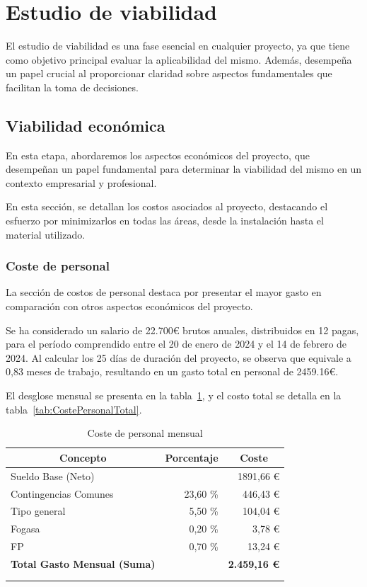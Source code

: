 \section{Estudio de viabilidad}
El estudio de viabilidad es una fase esencial en cualquier proyecto, ya que tiene como objetivo principal evaluar la aplicabilidad del mismo. Además, desempeña un papel crucial al proporcionar claridad sobre aspectos fundamentales que facilitan la toma de decisiones.

\subsection{Viabilidad económica}
En esta etapa, abordaremos los aspectos económicos del proyecto, que desempeñan un papel fundamental para determinar la viabilidad del mismo en un contexto empresarial y profesional.

En esta sección, se detallan los costos asociados al proyecto, destacando el esfuerzo por minimizarlos en todas las áreas, desde la instalación hasta el material utilizado.

\subsubsection{Coste de personal}
La sección de costos de personal destaca por presentar el mayor gasto en comparación con otros aspectos económicos del proyecto.

Se ha considerado un salario de 22.700€ brutos anuales, distribuidos en 12 pagas, para el período comprendido entre el 20 de enero de 2024 y el 14 de febrero de 2024. Al calcular los 25 días de duración del proyecto, se observa que equivale a 0,83 meses de trabajo, resultando en un gasto total en personal de 2459.16€.

El desglose mensual se presenta en la tabla~\ref{tab:CostePersonal}, y el costo total se detalla en la tabla~\ref{tab:CostePersonalTotal}.

\begin{longtable}[c]{@{}lrr@{}}
\toprule
\multicolumn{1}{c}{\textbf{Concepto}} & \multicolumn{1}{c}{\textbf{Porcentaje}} & \multicolumn{1}{c}{\textbf{Coste}} \\* \midrule
\endfirsthead
%
\endhead
%
\bottomrule
\endfoot
%
\endlastfoot
%
Sueldo Base (Neto) &  & 1891,66 € \\
Contingencias Comunes & 23,60 \% & 446,43 € \\
Tipo general & 5,50 \% & 104,04 € \\
Fogasa & 0,20 \% & 3,78 € \\
FP & 0,70 \% & 13,24 € \\ \hline
\textbf{Total Gasto Mensual (Suma)} & & \textbf{2.459,16 €} \\* \bottomrule \\
\caption{Coste de personal mensual}
\label{tab:CostePersonal}
\end{longtable}


